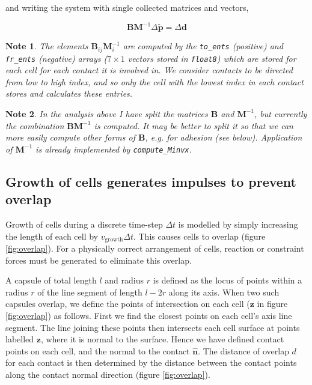 \documentclass{report}
\let\oldhat\hat
\renewcommand{\vec}[1]{\mathbf{#1}}
\renewcommand{\hat}[1]{\oldhat{\mathbf{#1}}}
\newcommand{\mat}{\mathbf}
\newcommand{\invmat}[1]{\mat{#1}^{-1}}
\newtheorem*{note}{Note}
\begin{document}
and writing the system with single collected matrices and vectors,

\begin{equation*}
\mat{B} \invmat{M} \Delta \tilde{\vec{p}} = \Delta \vec{d}
\end{equation*}

\begin{note}
The elements $\mat{B}_{ij}\invmat{M}_i$ are computed by the \texttt{to\_ents}
(positive) and
\texttt{fr\_ents} (negative) arrays ($7\times1$ vectors stored in
\texttt{float8}) which are stored for each cell for each contact it
is involved in. We consider contacts to be directed from low to high index, and
so only the cell with the lowest index in each contact stores and calculates
these entries.
\end{note}

\begin{note}
In the analysis above I have split the matrices $\mat{B}$ and $\invmat{M}$, but
currently the combination $\mat{B}\invmat{M}$ is computed. It may be better to
split it so that we can more easily compute other forms of $\mat{B}$, e.g. for adhesion (see
below). Application of $\invmat{M}$ is already implemented by
\texttt{compute\_Minvx}.
\end{note}


\subsection{Growth of cells generates impulses to prevent overlap}
Growth of cells during a discrete time-step $\Delta t$ is modelled by simply
increasing the length of each cell by $v_\textrm{growth}\Delta t$. This
causes cells to overlap (figure \ref{fig:overlap}). For a physically correct
arrangement of cells, reaction or constraint forces must be generated to
eliminate this overlap.

A capsule of total length $l$ and radius $r$
is defined as the locus of points within a
radius $r$ of the line segment of length $l-2r$ along its axis.
When two such capsules overlap, we define the points of intersection on each cell
($\vec{z}$ in figure \ref{fig:overlap}) as follows. First we find the closest points
on each cell's axis line segment. The line joining these points then intersects
each cell surface at points labelled $\vec{z}$, where it is normal to the surface.
Hence we have defined contact points on each cell, and the normal to the contact
$\hat{\vec{n}}$. The distance of overlap $d$ for each contact is then determined
by the distance between the contact points along the contact normal direction
(figure \ref{fig:overlap}). 
\end{document}
